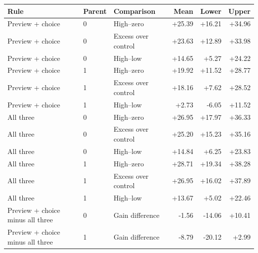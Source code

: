 \begin{tabular}{lllrrr}
\toprule
Rule & Parent & Comparison & Mean & Lower & Upper \\
\midrule
Preview + choice & 0 & High--zero & +25.39 & +16.21 & +34.96 \\
Preview + choice & 0 & Excess over control & +23.63 & +12.89 & +33.98 \\
Preview + choice & 0 & High--low & +14.65 & +5.27 & +24.22 \\
Preview + choice & 1 & High--zero & +19.92 & +11.52 & +28.77 \\
Preview + choice & 1 & Excess over control & +18.16 & +7.62 & +28.52 \\
Preview + choice & 1 & High--low & +2.73 & -6.05 & +11.52 \\
All three & 0 & High--zero & +26.95 & +17.97 & +36.33 \\
All three & 0 & Excess over control & +25.20 & +15.23 & +35.16 \\
All three & 0 & High--low & +14.84 & +6.25 & +23.83 \\
All three & 1 & High--zero & +28.71 & +19.34 & +38.28 \\
All three & 1 & Excess over control & +26.95 & +16.02 & +37.89 \\
All three & 1 & High--low & +13.67 & +5.02 & +22.46 \\
Preview + choice minus all three & 0 & Gain difference & -1.56 & -14.06 & +10.41 \\
Preview + choice minus all three & 1 & Gain difference & -8.79 & -20.12 & +2.99 \\
\bottomrule
\end{tabular}

